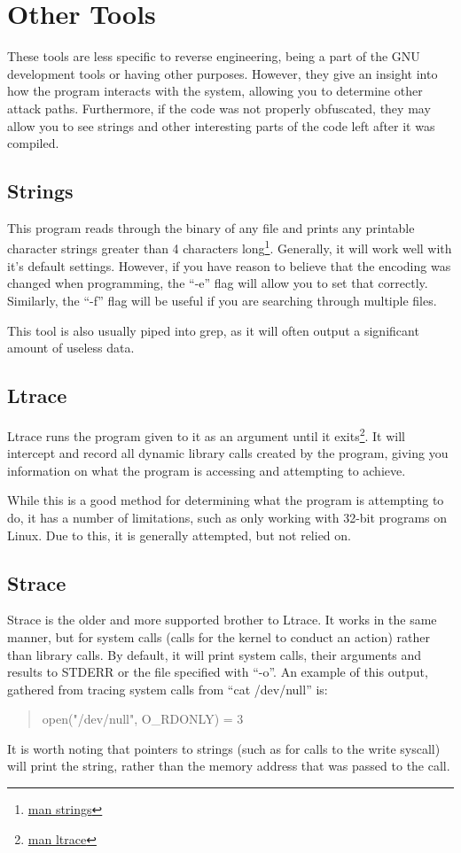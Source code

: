 	\section{Other Tools}
		These tools are less specific to reverse engineering, being a part of the GNU development tools or having other purposes. 
		However, they give an insight into how the program interacts with the system, allowing you to determine other attack paths. 
		Furthermore, if the code was not properly obfuscated, they may allow you to see strings and other interesting parts of the code left after it was compiled. 
		\subsection{Strings}
			This program reads through the binary of any file and prints any printable character strings greater than 4 characters long\footnote{\href{http://linuxcommand.org/man\_pages/strings1.html}{man strings}}.
			Generally, it will work well with it's default settings. 
			However, if you have reason to believe that the encoding was changed when programming, the ``-e'' flag will allow you to set that correctly. 
			Similarly, the ``-f'' flag will be useful if you are searching through multiple files. 

			This tool is also usually piped into grep, as it will often output a significant amount of useless data. 
		\subsection{Ltrace}
			Ltrace runs the program given to it as an argument until it exits\footnote{\href{http://linuxcommand.org/man\_pages/ltrace1.html}{man ltrace}}.
			It will intercept and record all dynamic library calls created by the program, giving you information on what the program is accessing and attempting to achieve. 
		
			While this is a good method for determining what the program is attempting to do, it has a number of limitations, such as only working with 32-bit programs on Linux. 
			Due to this, it is generally attempted, but not relied on. 
		\subsection{Strace}
			Strace is the older and more supported brother to Ltrace. 
			It works in the same manner, but for system calls (calls for the kernel to conduct an action) rather than library calls. 
			By default, it will print system calls, their arguments and results to STDERR or the file specified with ``-o''. 
			An example of this output, gathered from tracing system calls from ``cat /dev/null'' is:
			\begin{quote}
				open("/dev/null", O\_RDONLY) = 3
			\end{quote}
			It is worth noting that pointers to strings (such as for calls to the write syscall) will print the string, rather than the memory address that was passed to the call. 

